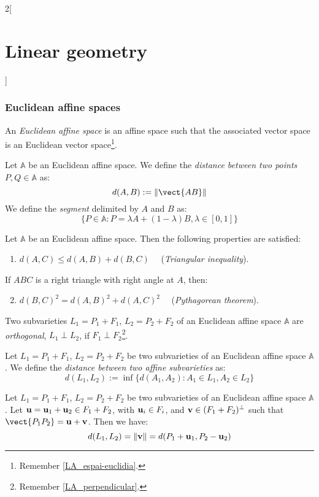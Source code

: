 \documentclass[../../../main_math.tex]{subfiles}
\begin{document}
\begin{multicols}{2}[\section{Linear geometry}]
  \subsubsection{Euclidean affine spaces}
  \begin{definition}
    An \emph{Euclidean affine space} is an affine space such that the associated vector space is an Euclidean vector space\footnote{Remember \cref{LA_espai-euclidia}.}.
  \end{definition}
  \begin{definition}
    Let $\mathbb{A}$ be an Euclidean affine space. We define the \emph{distance between two points} $P,Q\in\mathbb{A}$ as: $$d(A,B):=\|\vect{AB}\|$$ We define the \emph{segment} delimited by $A$ and $B$ as: $$\{P\in\mathbb{A}:P=\lambda A+(1-\lambda)B,\lambda\in[0,1]\}$$
  \end{definition}
  \begin{proposition}
    Let $\mathbb{A}$ be an Euclidean affine space. Then the following properties are satisfied:
    \begin{enumerate}
      \item $d(A,C)\leq d(A,B)+d(B,C)\quad$ (\emph{Triangular inequality}).
    \end{enumerate}
    If $ABC$ is a right triangle with right angle at $A$, then:
    \begin{enumerate}
      \setcounter{enumi}{1}
      \item $d(B,C)^2=d(A,B)^2+d(A,C)^2\quad$ (\emph{Pythagorean theorem}).
    \end{enumerate}
  \end{proposition}
  \begin{definition}
    Two subvarieties $L_1=P_1+F_1$, $L_2=P_2+F_2$ of an Euclidean affine space $\mathbb{A}$ are \emph{orthogonal}, $L_1\perp L_2$, if $F_1\perp F_2$\footnote{Remember \cref{LA_perpendicular}.}.
  \end{definition}
  \begin{definition}
    Let $L_1=P_1+F_1$, $L_2=P_2+F_2$ be two subvarieties of an Euclidean affine space $\mathbb{A}$. We define the \emph{distance between two affine subvarieties} as: $$d(L_1,L_2):=\inf\{d(A_1,A_2):A_1\in L_1, A_2\in L_2\}$$
  \end{definition}
  \begin{theorem}
    Let $L_1=P_1+F_1$, $L_2=P_2+F_2$ be two subvarieties of an Euclidean affine space $\mathbb{A}$. Let $\boldsymbol{\mathrm{u}}=\boldsymbol{\mathrm{u}}_1+\boldsymbol{\mathrm{u}}_2\in F_1+F_2$, with $\boldsymbol{\mathrm{u}}_i\in F_i$, and $\boldsymbol{\mathrm{v}}\in(F_1+F_2)^\perp$ such that $\vect{P_1P_2}=\vf{u}+\vf{v}$. Then we have: $$d(L_1,L_2)=\|\boldsymbol{\mathrm{v}}\|=d(P_1+\boldsymbol{\mathrm{u}}_1,P_2-\boldsymbol{\mathrm{u}}_2)$$
  \end{theorem}

\end{multicols}
\end{document}
